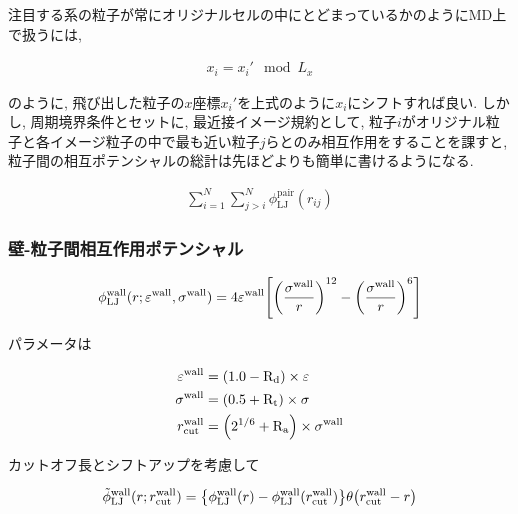 \documentclass[dvipdfmx]{jsarticle}
\numberwithin{equation}{subsection}
\begin{document}
注目する系の粒子が常にオリジナルセルの中にとどまっているかのようにMD上で扱うには,

\begin{align}
  x_{i} = x_{i}' \mod L_{x}
\end{align}

のように,  飛び出した粒子の$x$座標$x_{i}'$を上式のように$x_i$にシフトすれば良い. しかし, 周期境界条件とセットに, 最近接イメージ規約として, 粒子$i$がオリジナル粒子と各イメージ粒子の中で最も近い粒子$j$らとのみ相互作用をすることを課すと, 粒子間の相互ポテンシャルの総計は先ほどよりも簡単に書けるようになる.

\begin{align}
  \sum_{i=1}^{N} \sum_{j > i}^{N} \phi_{\text{LJ}}^{\text{pair}} (r_{ij})
\end{align}


\subsubsection{壁-粒子間相互作用ポテンシャル}


\begin{align}
  \phi_{\text{LJ}}^{\text{wall}}(r; \varepsilon^{\text{wall}}, \sigma^{\text{wall}}) = 4\varepsilon^{\text{wall}} \qty[\qty(\frac{\sigma^{\text{wall}}}{r})^{12} - \qty(\frac{\sigma^{\text{wall}}}{r})^{6} ] \\
\end{align}

パラメータは

\begin{align}
  \varepsilon^{\text{wall}} &= \qty(1.0 - \text{R}_\text{d}) \times \varepsilon \\
  \sigma^{\text{wall}} &= \qty(0.5 + \text{R}_\text{t}) \times \sigma \\
  r^{\text{wall}}_{\text{cut}} &= \qty(2^{1/6} + \text{R}_\text{a}) \times \sigma^{\text{wall}}
\end{align}



カットオフ長とシフトアップを考慮して



\begin{align}
  \tilde{\phi}_{\text{LJ}}^{\text{wall}}(r;r_{\text{cut}}^{\text{wall}}) = \qty{\phi_{\text{LJ}}^{\text{wall}}(r) - \phi_{\text{LJ}}^{\text{wall}}(r_{\text{cut}}^{\text{wall}})}\theta \qty(r_{\text{cut}}^{\text{wall}}-r) \\
\end{align}
\end{document}
